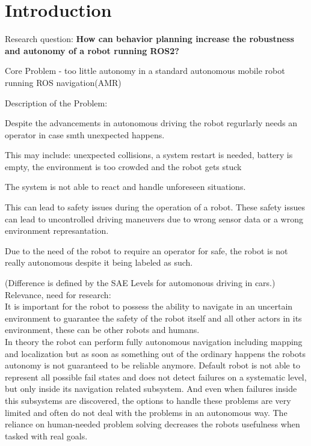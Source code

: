 \chapter{Introduction}
\label{cha:introduction}


Research question:
\textbf{How can behavior planning increase the robustness and autonomy of a robot running ROS2?}

Core Problem - too little autonomy in a standard autonomous mobile robot running ROS navigation(AMR)

Description of the Problem:

Despite the advancements in autonomous driving the robot regurlarly needs an operator in case smth unexpected happens.

This may include: unexpected collisions, a system restart is needed, battery is empty, the environment is too crowded and the robot gets stuck

The system is not able to react and handle unforeseen situations.

This can lead to safety issues during the operation of a robot. These safety issues can lead to uncontrolled driving maneuvers due to wrong sensor data or a wrong environment represantation.

Due to the need of the robot to require an operator for safe, the robot is not really autonomous despite it being labeled as such. 

(Difference is defined by the SAE Levels for automonous driving in cars.) \\

Relevance, need for research:\\
It is important for the robot to possess the ability to navigate in an uncertain environment to guarantee the safety of the robot itself and all other actors in its environment, these can be other robots and humans.\\

In theory the robot can perform fully autonomous navigation including mapping and localization but as soon as something out of the ordinary happens the robots autonomy is not guaranteed to be reliable anymore. 
Default robot is not able to represent all possible fail states and does not detect failures on a systematic level, but only inside its navigation related subsystem. And even when failures inside this subsystems are discovered, the options to handle these problems are very limited and often do not deal with the problems in an autonomous way. The reliance on human-needed problem solving decreases the robots usefulness when tasked with real goals. 

